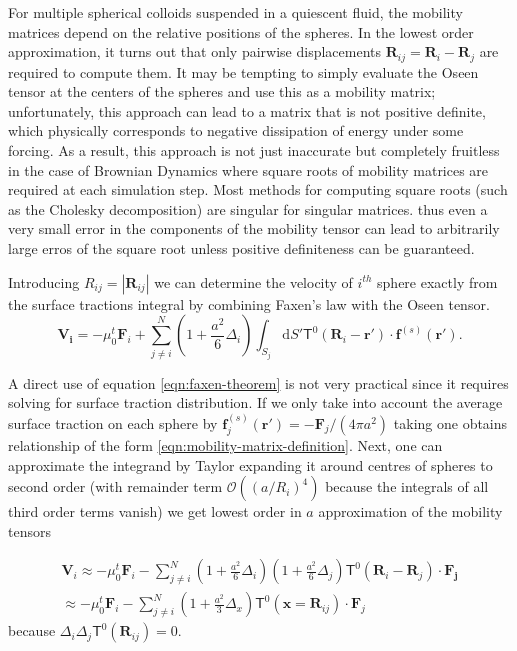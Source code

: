 \documentclass{doctoral}
\newcommand{\dd}{\mathrm{d}}
\newcommand{\mm}[1]{\bm{\mathsf{#1}}} %
\begin{document}
For multiple spherical colloids suspended in a quiescent fluid, the mobility matrices depend on the relative positions of the spheres.
In the lowest order approximation, it turns out that only pairwise displacements $\bm{R}_{ij} = \bm{R}_i - \bm{R}_j$ are required to compute them.
It may be tempting to simply evaluate the Oseen tensor at the centers of the spheres and use this as a mobility matrix; unfortunately, this approach can lead to a matrix that is not positive definite, which physically corresponds to negative dissipation of energy under some forcing.
As a result, this approach is not just inaccurate but completely fruitless in the case of Brownian Dynamics where square roots of mobility matrices are required at each simulation step.
Most methods for computing square roots (such as the Cholesky decomposition) are singular for singular matrices.
thus even a very small error in the components of the mobility tensor can lead to arbitrarily large erros of the square root unless positive definiteness can be guaranteed.

Introducing $R_{ij} = |\bm{R}_{ij}|$ we can determine the velocity of $i^{th}$ sphere exactly from the surface tractions integral by combining Faxen's law \cite{Faxen_1922} with the Oseen tensor.
\begin{equation}
    \bm{V_i} =
    -\mu_0^t \bm{F}_i
    + \sum_{j\neq i}^N
    (1 + \frac{a^2}{6} \Delta_i)
    \int_{S_j} \dd S' \mm{T}^0(\bm{R}_i-\bm{r'})\cdot \bm{f}^{(s)}(\bm{r'}).
    \label{eqn:faxen-theorem}
\end{equation}

A direct use of equation \eqref{eqn:faxen-theorem} is not very practical since it requires solving for surface traction distribution.
If we only take into account the average surface traction on each sphere  by $\bm{f}_j^{(s)}(\bm{r'}) = -\bm{F}_j / (4\pi a^2)$ taking one obtains relationship of the form \eqref{eqn:mobility-matrix-definition}.
Next, one can approximate the integrand by Taylor expanding it around centres of spheres to second order (with remainder term $\mathcal{O}((a/R_i)^4)$ because the integrals of all third order terms vanish) we get lowest order in $a$ approximation of the mobility tensors 

\begin{eqnarray}
    \bm{V}_i \approx -\mu_0^t \bm{F}_i  - \sum_{j\neq i}^N (1 + \frac{a^2}{6} \Delta_i) (1 + \frac{a^2}{6} \Delta_j) \mm{T}^{0} (\bm{R}_i - \bm{R}_j) \cdot \bm{F_j} \\
    \approx -\mu_0^t \bm{F}_i  - \sum_{j\neq i}^N (1 + \frac{a^2}{3} \Delta_x) \mm{T}^{0} (\bm{x} = \bm{R}_{ij}) \cdot \bm{F}_j \label{eqn:rotne-prager-derivation}
\end{eqnarray}
because $\Delta_i \Delta_j \mm{T}^0(\bm{R}_{ij}) = 0$.
\end{document}

